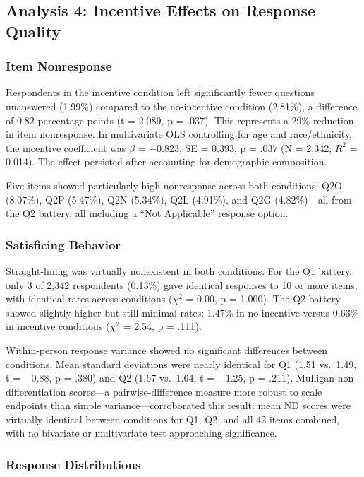 \documentclass[12pt]{article}
\begin{document}
\subsection{Analysis 4: Incentive Effects on Response Quality}

\subsubsection{Item Nonresponse}

Respondents in the incentive condition left significantly fewer questions unanswered (1.99\%) compared to the no-incentive condition (2.81\%), a difference of 0.82 percentage points (t = 2.089, p = .037). This represents a 29\% reduction in item nonresponse. In multivariate OLS controlling for age and race/ethnicity, the incentive coefficient was $\beta$ = $-$0.823, SE = 0.393, p = .037 (N = 2,342; $R^2$ = 0.014). The effect persisted after accounting for demographic composition.

Five items showed particularly high nonresponse across both conditions: Q2O (8.07\%), Q2P (5.47\%), Q2N (5.34\%), Q2L (4.91\%), and Q2G (4.82\%)---all from the Q2 battery, all including a ``Not Applicable'' response option.

\subsubsection{Satisficing Behavior}

Straight-lining was virtually nonexistent in both conditions. For the Q1 battery, only 3 of 2,342 respondents (0.13\%) gave identical responses to 10 or more items, with identical rates across conditions ($\chi^2$ = 0.00, p = 1.000). The Q2 battery showed slightly higher but still minimal rates: 1.47\% in no-incentive versus 0.63\% in incentive conditions ($\chi^2$ = 2.54, p = .111).

Within-person response variance showed no significant differences between conditions. Mean standard deviations were nearly identical for Q1 (1.51 vs.\ 1.49, t = $-$0.88, p = .380) and Q2 (1.67 vs.\ 1.64, t = $-$1.25, p = .211). Mulligan non-differentiation scores---a pairwise-difference measure more robust to scale endpoints than simple variance---corroborated this result: mean ND scores were virtually identical between conditions for Q1, Q2, and all 42 items combined, with no bivariate or multivariate test approaching significance.

\subsubsection{Response Distributions}
\end{document}
